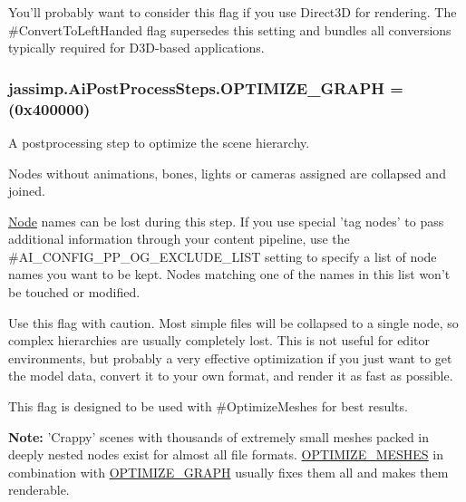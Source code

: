 {You'll probably want to consider this flag if you use Direct3\+D for rendering. The \#\+Convert\+To\+Left\+Handed flag supersedes this setting and bundles all conversions typically required for D3\+D-\/based applications. \hypertarget{enumjassimp_1_1_ai_post_process_steps_ad9dbc2a5efa1877b72a2998e59783931}{
\subsubsection[{O\+P\+T\+I\+M\+I\+Z\+E\+\_\+\+G\+R\+A\+P\+H}]{\setlength{\rightskip}{0pt plus 5cm}jassimp.\+Ai\+Post\+Process\+Steps.\+O\+P\+T\+I\+M\+I\+Z\+E\+\_\+\+G\+R\+A\+P\+H =(0x400000)}}\label{enumjassimp_1_1_ai_post_process_steps_ad9dbc2a5efa1877b72a2998e59783931}
A postprocessing step to optimize the scene hierarchy.

Nodes without animations, bones, lights or cameras assigned are collapsed and joined.

\hyperlink{struct_node}{Node} names can be lost during this step. If you use special 'tag nodes' to pass additional information through your content pipeline, use the {\ttfamily \#\+A\+I\+\_\+\+C\+O\+N\+F\+I\+G\+\_\+\+P\+P\+\_\+\+O\+G\+\_\+\+E\+X\+C\+L\+U\+D\+E\+\_\+\+L\+I\+S\+T} setting to specify a list of node names you want to be kept. Nodes matching one of the names in this list won't be touched or modified.

Use this flag with caution. Most simple files will be collapsed to a single node, so complex hierarchies are usually completely lost. This is not useful for editor environments, but probably a very effective optimization if you just want to get the model data, convert it to your own format, and render it as fast as possible.

This flag is designed to be used with \#\+Optimize\+Meshes for best results.

{\bfseries Note\+:} 'Crappy' scenes with thousands of extremely small meshes packed in deeply nested nodes exist for almost all file formats. \hyperlink{enumjassimp_1_1_ai_post_process_steps_ae7fee68ad0e7ad1b5736cfbe62914b52}{O\+P\+T\+I\+M\+I\+Z\+E\+\_\+\+M\+E\+S\+H\+E\+S} in combination with \hyperlink{enumjassimp_1_1_ai_post_process_steps_ad9dbc2a5efa1877b72a2998e59783931}{O\+P\+T\+I\+M\+I\+Z\+E\+\_\+\+G\+R\+A\+P\+H} usually fixes them all and makes them renderable. \hypertarget{enumjassimp_1_1_ai_post_process_steps_ae7fee68ad0e7ad1b5736cfbe62914b52}{
}}
